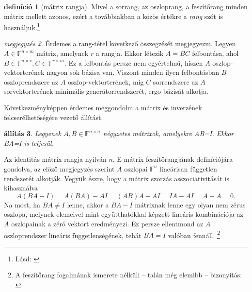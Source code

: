 \documentclass[9pt, showtrims]{memoir}
\makeatletter
\renewenvironment{proof}[1][\proofname]
    {\par\pushQED{\qed}%
    \normalfont \topsep6\p@\@plus6\p@\relax
    \trivlist
    \item[\hskip\labelsep
        \itshape
    #1\@addpunct{:}]\ignorespaces}
    {\popQED\endtrivlist\@endpefalse}
\theoremstyle{plain}
\newtheorem{proposition}{állítás}[section]
\theoremstyle{remark}
\newtheorem{note}[proposition]{megjegyzés}
\theoremstyle{definition}
\newtheorem{definition}[proposition]{definíció}
\makeatother
\begin{document}
\begin{definition}[mátrix rangja]
    Mivel a sorrang, az oszloprang, a feszítőrang minden mátrix mellett azonos,
    ezért a továbbiakban a közös értékre a \emph{rang} szót is használjuk.\footnote{Lásd: \parencite{Wardlaw2005}}
\end{definition}
\begin{note}
    Érdemes a rang-tétel következő összegzését megjegyezni.
    Legyen $A\in\mathbb{F}^{n\times m}$ mátrix, amelynek $r$ a rangja.
    Ekkor létezik $A=BC$ felbontása, ahol $B\in\mathbb{F}^{n\times r},C\in\mathbb{F}^{r\times m}$.
    Ez a felbontás persze nem egyértelmű, hiszen $A$ oszlop-vektorterének nagyon sok bázisa van.
    Viszont minden ilyen felbontásban $B$ oszloprendszere az $A$ oszlop-vektorterének, 
    míg $C$ sorrendszere az $A$ sorvektorterének minimális generátorrendszerét, ergo bázisát alkotja.
\end{note}
Következményképpen érdemes meggondolni a mátrix és inverzének felcserélhetőségére vezető állítást.
\begin{proposition}
    Legyenek $A,B\in\mathbb{F}^{n\times n}$ négyzetes mátrixok, amelyekre AB=I.
    Ekkor BA=I is teljesül.
\end{proposition}
\begin{proof}
    Az identitás mátrix rangja nyilván $n$.
    E mátrix feszítőrangjának definíciójára gondolva, 
    az előző megjegyzés szerint $A$ oszlopai $\mathbb{F}^n$ lineárisan független rendszerét alkotják.
    Vegyük észre, hogy a mátrix szorzás asszociativitását is kihasználva
    \[
        A\left( BA-I \right)=A\left( BA \right)-AI=\left( AB \right)A-AI=IA-AI=A-A=0.
    \]
    Na most, 
    ha $BA\neq I$ lenne, 
    akkor a $BA-I$ mátrixnak lenne egy olyan nem zérus oszlopa, 
    melynek elemeivel mint együtthatókkal képzett lineáris kombinációja az $A$ oszlopainak 
    a zéró vektort eredményezi.
    Ez persze ellentmond az $A$ oszloprendszer lineáris függetlenségének,
    tehát $BA=I$ valóban fennáll.%
    \footnote{%
        A feszítőrang fogalmának ismerete nélküli -- talán még elemibb -- bizonyítás: \parencite{doi:10.4169/college.math.j.48.5.366}%
    }%
\end{proof}
\end{document}
